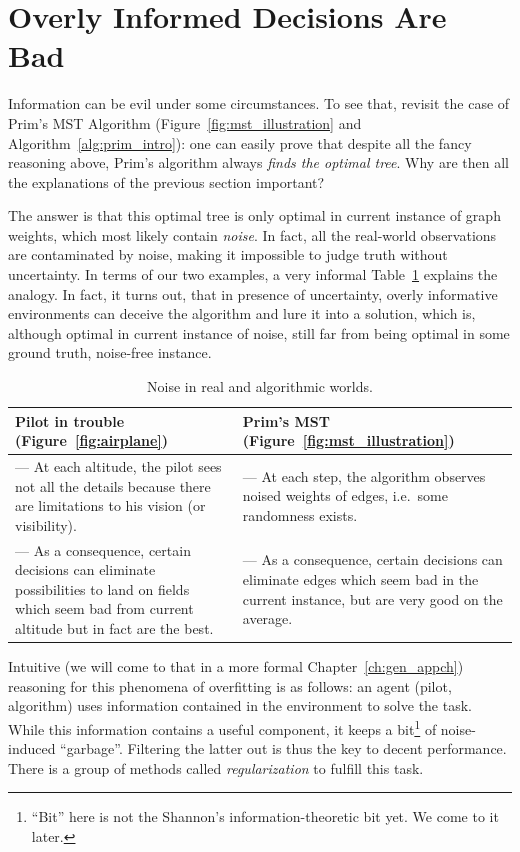 \section{Overly Informed Decisions Are Bad}

Information can be evil under some circumstances. To see that, revisit the
case of Prim's MST Algorithm (Figure~\ref{fig:mst_illustration} and
Algorithm~\ref{alg:prim_intro}): one can easily prove that despite all the fancy
reasoning above, Prim's algorithm always \textit{finds the optimal tree}. Why are
then all the explanations of the previous section important?

The answer is that this optimal tree is only optimal in current instance of
graph weights, which most likely contain \textit{noise}. In fact, all the
real-world observations are contaminated by noise, making it impossible to judge
truth without uncertainty. In terms of our two examples, a very informal
Table~\ref{table:mst_algorithm_and_pilot_noise} explains the analogy. In fact,
it turns out, that in presence of uncertainty, overly informative environments
can deceive the algorithm and lure it into a solution, which is, although
optimal in current instance of noise, still far from being optimal in some 
ground truth, noise-free instance.

\begin{table}[t]
\centering
\begin{tabular}{p{5cm}p{5cm}}
\toprule
Pilot in trouble (Figure~\ref{fig:airplane}) & Prim's MST
(Figure~\ref{fig:mst_illustration})
\tabularnewline \midrule
    --- At each altitude, the pilot sees not all the details
    because there are limitations to his vision (or visibility).
    &
    --- At each step, the algorithm observes noised weights of edges, i.e.~some
    randomness exists.
    \tabularnewline
    --- As a consequence, certain decisions can eliminate possibilities to land
    on fields which seem bad from current altitude but in fact are the best.
    &
    --- As a consequence, certain decisions can eliminate edges which seem
    bad in the current instance, but are very good on the average.
    \tabularnewline
\bottomrule
\end{tabular}
\caption{Noise in real and algorithmic worlds.}
\label{table:mst_algorithm_and_pilot_noise}
\end{table}

Intuitive (we will come to that in a more formal Chapter~\ref{ch:gen_appch})
reasoning for this phenomena of overfitting  is as follows:
an agent (pilot, algorithm) uses information contained in the environment to
solve the task. While this information contains a useful component, it keeps a
bit\footnote{``Bit'' here is not the Shannon's information-theoretic bit yet. We
come to it later.} of noise-induced ``garbage''. Filtering the latter out is thus the
key to decent performance. There is a group of methods called
\textit{regularization}  to fulfill this task.

